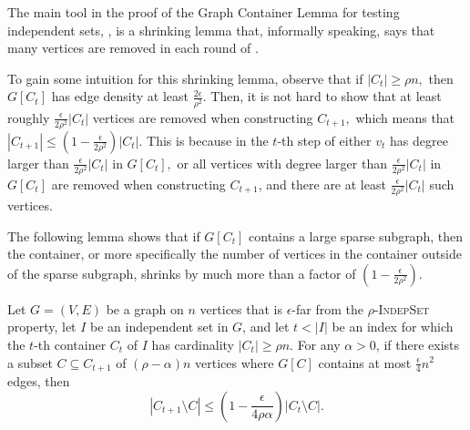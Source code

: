 \documentclass[11pt]{article}
\begin{document}
The main tool in the proof of the Graph Container Lemma for testing independent sets, , is a shrinking lemma that, informally speaking, says that many vertices are removed in each round of .

To gain some intuition for this shrinking lemma, observe that if $|C_t| \geq \rho n,$ then $G[C_t]$ has edge density at least $\frac{2\epsilon}{\rho^2}.$
Then, it is not hard to show that at least roughly $\frac{\epsilon}{2\rho^2}|C_t|$ vertices are removed when constructing $C_{t+1},$ which means that $|C_{t+1}| \leq \left(1-\frac{\epsilon}{2\rho^2}\right)|C_t|.$
This is because in the $t$-th step of  either $v_t$ has degree larger than $\frac{\epsilon}{2\rho^2}|C_t|$ in $G[C_t],$ or all vertices with degree larger than $\frac{\epsilon}{2\rho^2}|C_t|$ in $G[C_t]$ are removed when constructing $C_{t+1}$, and there are at least $\frac{\epsilon}{2\rho^2}|C_t|$ such vertices. 

The following lemma shows that if $G[C_t]$ contains a large sparse subgraph, then the container, or more specifically the number of vertices in the container outside of the sparse subgraph, shrinks by much more than a factor of $(1-\frac{\epsilon}{2\rho^2}).$

\begin{lemma}
\label{lem:containers-shrinking}
Let $G = (V,E)$ be a graph on $n$ vertices that is $\epsilon$-far from the \textsc{$\rho$-IndepSet} property,  let $I$ be an independent set in $G$, and let $t < |I|$ be an index for which the $t$-th container $C_{t}$ of $I$ has cardinality $|C_{t}| \ge \rho n$. For any $\alpha > 0$, if there exists a subset $C \subseteq C_{t+1}$ of $(\rho - \alpha) n$ vertices where $G[C]$ contains at most $\frac{\epsilon}{4} n^2$ edges, then
\[
\left|C_{t+1} \setminus C\right| \le \left( 1 - \frac{\epsilon}{4\rho \alpha} \right) \left| C_{t} \setminus C \right|.
\]
\end{lemma}
\end{document}
